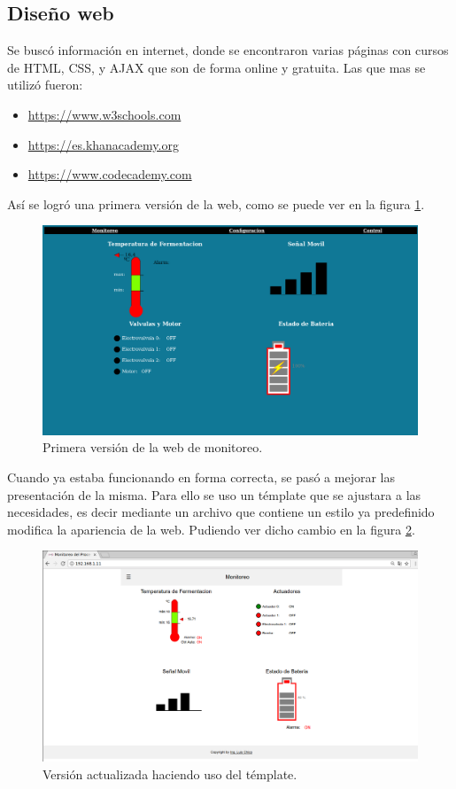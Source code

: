 \subsection*{Diseño web}
Se buscó información en internet, donde se encontraron varias páginas con cursos de HTML, CSS, y AJAX que son de forma online y gratuita. Las que mas se utilizó fueron:
\begin{itemize}
  \item \url{https://www.w3schools.com}
  \item \url{https://es.khanacademy.org}
  \item \url{https://www.codecademy.com}
\end{itemize}
Así se logró una primera versión de la web, como se puede ver en la figura \ref{fig:old_web}.
\begin{figure}[!htb]
  \centering
  \includegraphics[scale=.25]{./Figures/old_web.png}
  \caption{Primera versión de la web de monitoreo.}
  \label{fig:old_web}
\end{figure}

Cuando ya estaba funcionando en forma correcta, se pasó a mejorar las presentación de la misma. Para ello se uso un témplate que se ajustara a las necesidades, es decir mediante un archivo que contiene un estilo ya predefinido modifica la apariencia de la web. Pudiendo ver dicho cambio en la figura \ref{fig:web_monitoreo}.

\begin{figure}[!h]
  \centering
  \includegraphics[scale=.25]{./Figures/web_monitoreo.png}
  \caption{Versión actualizada haciendo uso del témplate.}
  \label{fig:web_monitoreo}
\end{figure}

